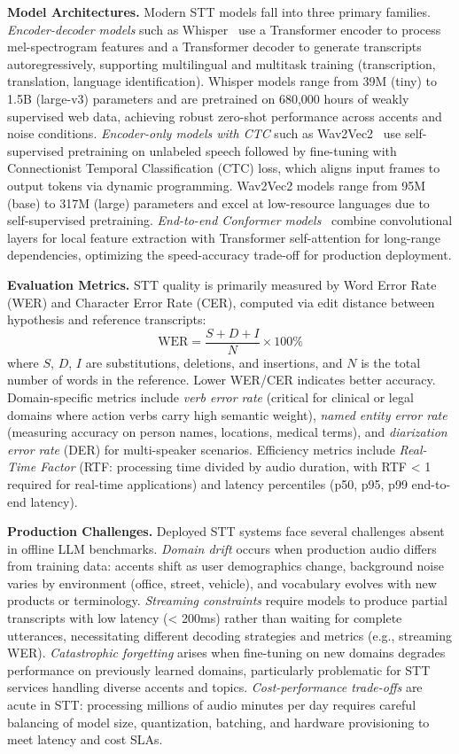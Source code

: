 \documentclass[conference]{IEEEtran}
\begin{document}
\textbf{Model Architectures.} Modern STT models fall into three primary families. \textit{Encoder-decoder models} such as Whisper~\cite{whisper-paper} use a Transformer encoder to process mel-spectrogram features and a Transformer decoder to generate transcripts autoregressively, supporting multilingual and multitask training (transcription, translation, language identification). Whisper models range from 39M (tiny) to 1.5B (large-v3) parameters and are pretrained on 680,000 hours of weakly supervised web data, achieving robust zero-shot performance across accents and noise conditions. \textit{Encoder-only models with CTC} such as Wav2Vec2~\cite{wav2vec2-paper} use self-supervised pretraining on unlabeled speech followed by fine-tuning with Connectionist Temporal Classification (CTC) loss, which aligns input frames to output tokens via dynamic programming. Wav2Vec2 models range from 95M (base) to 317M (large) parameters and excel at low-resource languages due to self-supervised pretraining. \textit{End-to-end Conformer models}~\cite{conformer-paper} combine convolutional layers for local feature extraction with Transformer self-attention for long-range dependencies, optimizing the speed-accuracy trade-off for production deployment.

\textbf{Evaluation Metrics.} STT quality is primarily measured by Word Error Rate (WER) and Character Error Rate (CER), computed via edit distance between hypothesis and reference transcripts:
\[
\text{WER} = \frac{S + D + I}{N} \times 100\%
\]
where $S$, $D$, $I$ are substitutions, deletions, and insertions, and $N$ is the total number of words in the reference. Lower WER/CER indicates better accuracy. Domain-specific metrics include \textit{verb error rate} (critical for clinical or legal domains where action verbs carry high semantic weight), \textit{named entity error rate} (measuring accuracy on person names, locations, medical terms), and \textit{diarization error rate} (DER) for multi-speaker scenarios. Efficiency metrics include \textit{Real-Time Factor} (RTF: processing time divided by audio duration, with RTF < 1 required for real-time applications) and latency percentiles (p50, p95, p99 end-to-end latency).

\textbf{Production Challenges.} Deployed STT systems face several challenges absent in offline LLM benchmarks. \textit{Domain drift} occurs when production audio differs from training data: accents shift as user demographics change, background noise varies by environment (office, street, vehicle), and vocabulary evolves with new products or terminology. \textit{Streaming constraints} require models to produce partial transcripts with low latency (< 200ms) rather than waiting for complete utterances, necessitating different decoding strategies and metrics (e.g., streaming WER). \textit{Catastrophic forgetting} arises when fine-tuning on new domains degrades performance on previously learned domains, particularly problematic for STT services handling diverse accents and topics. \textit{Cost-performance trade-offs} are acute in STT: processing millions of audio minutes per day requires careful balancing of model size, quantization, batching, and hardware provisioning to meet latency and cost SLAs.
\end{document}
